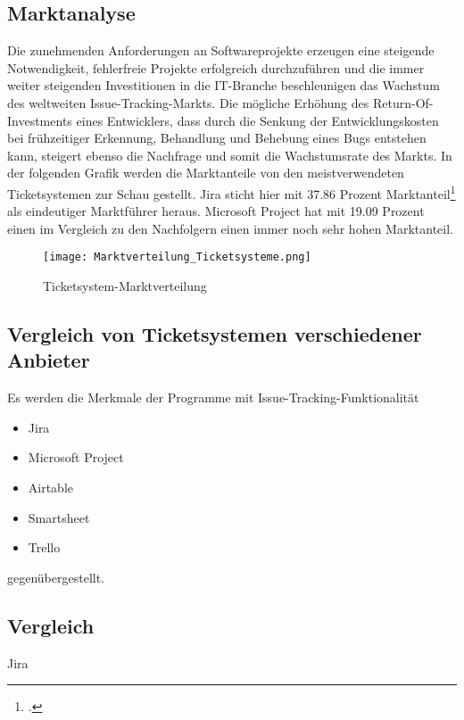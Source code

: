 \subsection{Marktanalyse}  
Die zunehmenden Anforderungen an Softwareprojekte erzeugen eine steigende Notwendigkeit, fehlerfreie Projekte erfolgreich durchzuführen und die immer weiter steigenden Investitionen in die IT-Branche beschleunigen das Wachstum des weltweiten Issue-Tracking-Markts.
Die mögliche Erhöhung des Return-Of-Investments eines Entwicklers, dass durch die Senkung der Entwicklungskosten bei frühzeitiger Erkennung, Behandlung und Behebung eines Bugs entstehen kann, steigert ebenso die Nachfrage und somit die Wachstumsrate des Markts.
In der folgenden Grafik werden die Marktanteile von den meistverwendeten Ticketsystemen zur Schau gestellt.
Jira sticht hier mit 37.86 Prozent Marktanteil\footcite{marktanteile} als eindeutiger Marktführer heraus. Microsoft Project hat mit 19.09 Prozent einen im Vergleich zu den Nachfolgern einen immer noch sehr hohen Marktanteil.
\begin{figure}[H]
 	\centering
	\texttt{[image: Marktverteilung\_Ticketsysteme.png]}
	\caption{Ticketsystem-Marktverteilung}
\end{figure}   
\subsection{Vergleich von Ticketsystemen verschiedener Anbieter}
Es werden die Merkmale der Programme mit Issue-Tracking-Funktionalität
\begin{itemize}
	\item Jira
	\item Microsoft Project
	\item Airtable
	\item Smartsheet
	\item Trello
\end{itemize}
gegenübergestellt.
\newpage  
\subsection{Vergleich}	
Jira

